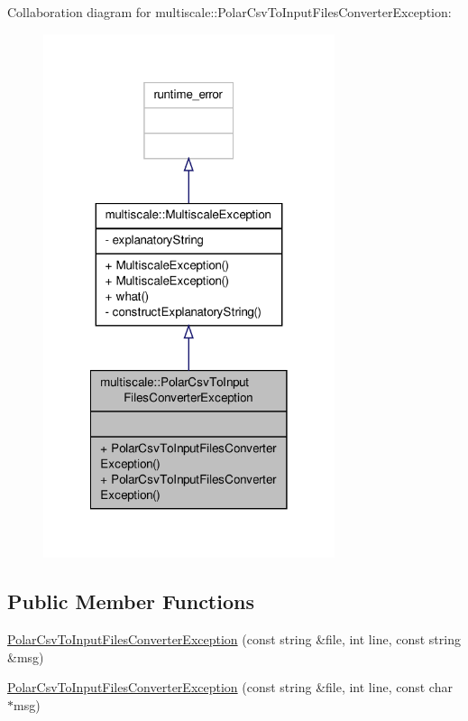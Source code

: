 Collaboration diagram for multiscale\-:\-:Polar\-Csv\-To\-Input\-Files\-Converter\-Exception\-:\nopagebreak
\begin{figure}[H]
\begin{center}
\leavevmode
\includegraphics[width=242pt]{classmultiscale_1_1PolarCsvToInputFilesConverterException__coll__graph}
\end{center}
\end{figure}
\subsection*{Public Member Functions}
\begin{DoxyCompactItemize}
\item 
\hyperlink{classmultiscale_1_1PolarCsvToInputFilesConverterException_aad248ad53256f6a79ac3de1fedeab8f5}{Polar\-Csv\-To\-Input\-Files\-Converter\-Exception} (const string \&file, int line, const string \&msg)
\item 
\hyperlink{classmultiscale_1_1PolarCsvToInputFilesConverterException_a0c87ad44e5f7c60491bcb533d03c8677}{Polar\-Csv\-To\-Input\-Files\-Converter\-Exception} (const string \&file, int line, const char $\ast$msg)
\end{DoxyCompactItemize}


